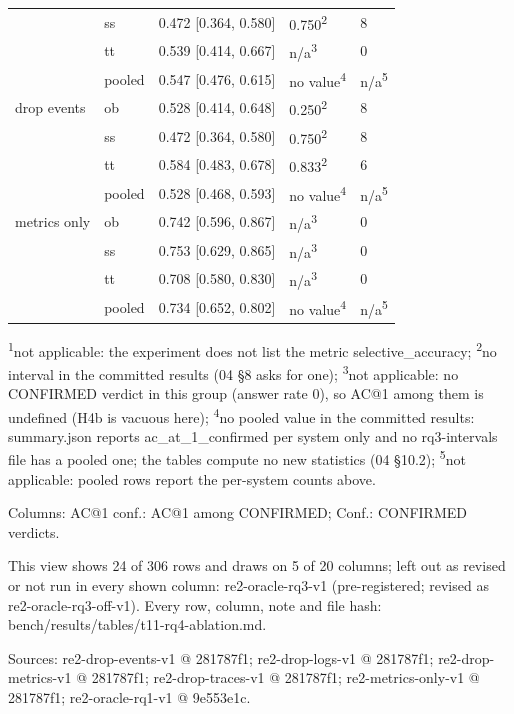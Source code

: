 \begin{table}[t]
\begin{tabular}{@{}lllll@{}}
 & ss & 0.472 [0.364, 0.580] & 0.750\textsuperscript{2} & 8 \\
 & tt & 0.539 [0.414, 0.667] & n/a\textsuperscript{3} & 0 \\
 & pooled & 0.547 [0.476, 0.615] & no value\textsuperscript{4} & n/a\textsuperscript{5} \\
drop events & ob & 0.528 [0.414, 0.648] & 0.250\textsuperscript{2} & 8 \\
 & ss & 0.472 [0.364, 0.580] & 0.750\textsuperscript{2} & 8 \\
 & tt & 0.584 [0.483, 0.678] & 0.833\textsuperscript{2} & 6 \\
 & pooled & 0.528 [0.468, 0.593] & no value\textsuperscript{4} & n/a\textsuperscript{5} \\
metrics only & ob & 0.742 [0.596, 0.867] & n/a\textsuperscript{3} & 0 \\
 & ss & 0.753 [0.629, 0.865] & n/a\textsuperscript{3} & 0 \\
 & tt & 0.708 [0.580, 0.830] & n/a\textsuperscript{3} & 0 \\
 & pooled & 0.734 [0.652, 0.802] & no value\textsuperscript{4} & n/a\textsuperscript{5} \\
\hline
\end{tabular}
\par\smallskip\scriptsize\raggedright
\textsuperscript{1}not applicable: the experiment does not list the metric selective\_accuracy; \textsuperscript{2}no interval in the committed results (04 \S{}8 asks for one); \textsuperscript{3}not applicable: no CONFIRMED verdict in this group (answer rate 0), so AC@1 among them is undefined (H4b is vacuous here); \textsuperscript{4}no pooled value in the committed results: summary.json reports ac\_at\_1\_confirmed per system only and no rq3-intervals file has a pooled one; the tables compute no new statistics (04 \S{}10.2); \textsuperscript{5}not applicable: pooled rows report the per-system counts above.\par
Columns: AC@1 conf.: AC@1 among CONFIRMED; Conf.: CONFIRMED verdicts.\par
This view shows 24 of 306 rows and draws on 5 of 20 columns; left out as revised or not run in every shown column: re2-oracle-rq3-v1 (pre-registered; revised as re2-oracle-rq3-off-v1). Every row, column, note and file hash: bench/\allowbreak{}results/\allowbreak{}tables/\allowbreak{}t11-rq4-ablation.md.\par
Sources: re2-drop-events-v1 @ 281787f1; re2-drop-logs-v1 @ 281787f1; re2-drop-metrics-v1 @ 281787f1; re2-drop-traces-v1 @ 281787f1; re2-metrics-only-v1 @ 281787f1; re2-oracle-rq1-v1 @ 9e553e1c.\par
\end{table}
